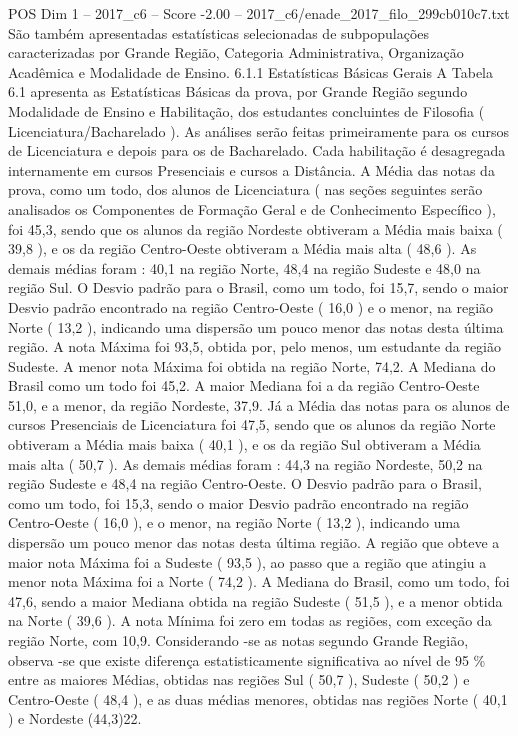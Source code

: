 \begin{textsample}{POS Dim 1 – 2017\_c6 – Score -2.00 – 2017\_c6/enade\_2017\_filo\_299cb010c7.txt}
São também apresentadas estatísticas selecionadas de subpopulações caracterizadas por Grande Região, Categoria Administrativa, Organização Acadêmica e Modalidade de Ensino. 6.1.1 Estatísticas Básicas Gerais A Tabela 6.1 apresenta as Estatísticas Básicas da prova, por Grande Região segundo Modalidade de Ensino e Habilitação, dos estudantes concluintes de Filosofia ( Licenciatura/Bacharelado ).
As análises serão feitas primeiramente para os cursos de Licenciatura e depois para os de Bacharelado.
Cada habilitação é desagregada internamente em cursos Presenciais e cursos a Distância.
A Média das notas da prova, como um todo, dos alunos de Licenciatura ( nas seções seguintes serão analisados os Componentes de Formação Geral e de Conhecimento Específico ), foi 45,3, sendo que os alunos da região Nordeste obtiveram a Média mais baixa ( 39,8 ), e os da região Centro-Oeste obtiveram a Média mais alta ( 48,6 ).
As demais médias foram : 40,1 na região Norte, 48,4 na região Sudeste e 48,0 na região Sul.
O Desvio padrão para o Brasil, como um todo, foi 15,7, sendo o maior Desvio padrão encontrado na região Centro-Oeste ( 16,0 ) e o menor, na região Norte ( 13,2 ), indicando uma dispersão um pouco menor das notas desta última região.
A nota Máxima foi 93,5, obtida por, pelo menos, um estudante da região Sudeste.
A menor nota Máxima foi obtida na região Norte, 74,2.
A Mediana do Brasil como um todo foi 45,2.
A maior Mediana foi a da região Centro-Oeste 51,0, e a menor, da região Nordeste, 37,9.
Já a Média das notas para os alunos de cursos Presenciais de Licenciatura foi 47,5, sendo que os alunos da região Norte obtiveram a Média mais baixa ( 40,1 ), e os da região Sul obtiveram a Média mais alta ( 50,7 ).
As demais médias foram : 44,3 na região Nordeste, 50,2 na região Sudeste e 48,4 na região Centro-Oeste.
O Desvio padrão para o Brasil, como um todo, foi 15,3, sendo o maior Desvio padrão encontrado na região Centro-Oeste ( 16,0 ), e o menor, na região Norte ( 13,2 ), indicando uma dispersão um pouco menor das notas desta última região.
A região que obteve a maior nota Máxima foi a Sudeste ( 93,5 ), ao passo que a região que atingiu a menor nota Máxima foi a Norte ( 74,2 ).
A Mediana do Brasil, como um todo, foi 47,6, sendo a maior Mediana obtida na região Sudeste ( 51,5 ), e a menor obtida na Norte ( 39,6 ).
A nota Mínima foi zero em todas as regiões, com exceção da região Norte, com 10,9.
Considerando -se as notas segundo Grande Região, observa -se que existe diferença estatisticamente significativa ao nível de 95 \% entre as maiores Médias, obtidas nas regiões Sul ( 50,7 ), Sudeste ( 50,2 ) e Centro-Oeste ( 48,4 ), e as duas médias menores, obtidas nas regiões Norte ( 40,1 ) e Nordeste (44,3)22.

\end{textsample}
